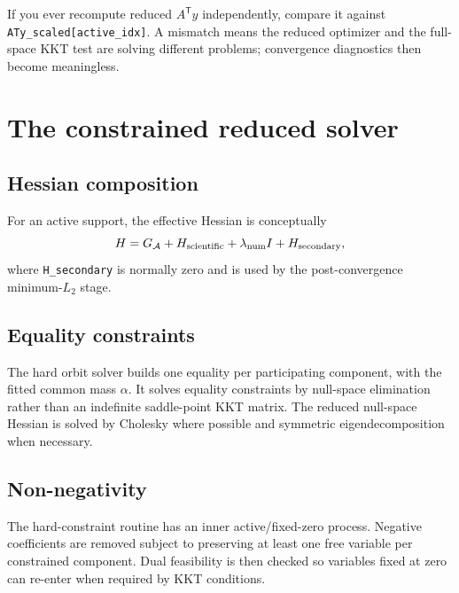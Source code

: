 \documentclass[10pt,a4paper]{article}
\newcommand{\code}[1]{\texttt{#1}}
\newenvironment{maintnote}{\begin{leftbar}\small\color{darkgray}}{\end{leftbar}}
\begin{document}
\begin{maintnote}
If you ever recompute reduced $A^{\mathsf T}y$ independently, compare it against \code{ATy\_scaled[active\_idx]}. A mismatch means the reduced optimizer and the full-space KKT test are solving different problems; convergence diagnostics then become meaningless.
\end{maintnote}

\section{The constrained reduced solver}
\subsection{Hessian composition}
For an active support, the effective Hessian is conceptually
\[
H = G_{\mathcal A}+H_{\rm scientific}+\lambda_{\rm num}I+H_{\rm secondary},
\]
where \code{H\_secondary} is normally zero and is used by the post-convergence minimum-$L_2$ stage.

\subsection{Equality constraints}
The hard orbit solver builds one equality per participating component, with the fitted common mass $\alpha$. It solves equality constraints by null-space elimination rather than an indefinite saddle-point KKT matrix. The reduced null-space Hessian is solved by Cholesky where possible and symmetric eigendecomposition when necessary.

\subsection{Non-negativity}
The hard-constraint routine has an inner active/fixed-zero process. Negative coefficients are removed subject to preserving at least one free variable per constrained component. Dual feasibility is then checked so variables fixed at zero can re-enter when required by KKT conditions.
\end{document}
